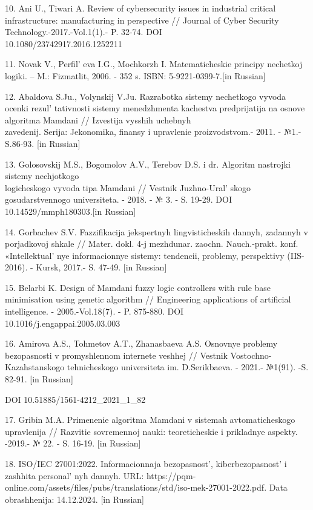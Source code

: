 \begin{references}
10. Ani U., Tiwari A. Review of cybersecurity issues in industrial
critical infrastructure: manufacturing in perspective // Journal of
Cyber Security Technology.-2017.-Vol.1(1).- P. 32-74. DOI\\
10.1080/23742917.2016.1252211

11. Novak V., Perfil' eva I.G., Mochkorzh I.
Matematicheskie principy nechetkoj logiki. -- M.: Fizmatlit, 2006. - 352
s. ISBN: 5-9221-0399-7.{[}in Russian{]}

12. Abaldova S.Ju., Volynskij V.Ju. Razrabotka sistemy nechetkogo vyvoda
ocenki rezul' tativnosti sistemy menedzhmenta kachestva
predprijatija na osnove algoritma Mamdani // Izvestija vysshih uchebnyh\\
zavedenij. Serija: Jekonomika, finansy i upravlenie proizvodstvom.-
2011. - №1.- S.86-93. {[}in Russian{]}

13. Golosovskij M.S., Bogomolov A.V., Terebov D.S. i dr. Algoritm
nastrojki sistemy nechjotkogo \\logicheskogo vyvoda tipa Mamdani //
Vestnik Juzhno-Ural' skogo gosudarstvennogo universiteta.
- 2018. - № 3. - S. 19-29. DOI 10.14529/mmph180303.{[}in Russian{]}

14. Gorbachev S.V. Fazzifikacija jekspertnyh lingvisticheskih dannyh,
zadannyh v porjadkovoj shkale // Mater. dokl. 4-j mezhdunar. zaochn.
Nauch.-prakt. konf. «Intellektual' nye informacionnye
sistemy: tendencii, problemy, perspektivy (IIS-2016). - Kursk, 2017.- S.
47-49. {[}in Russian{]}

15. Belarbi K. Design of Mamdani fuzzy logic controllers with rule base
minimisation using genetic algorithm // Engineering applications of
artificial intelligence. - 2005.-Vol.18(7). - P. 875-880. DOI\\
10.1016/j.engappai.2005.03.003

16. Amirova A.S., Tohmetov A.T., Zhanasbaeva A.S. Osnovnye problemy
bezopasnosti v promyshlennom internete veshhej // Vestnik
Vostochno-Kazahstanskogo tehnicheskogo universiteta im. D.Serikbaeva. -
2021.- №1(91). -S. 82-91. {[}in Russian{]}

DOI 10.51885/1561-4212\_2021\_1\_82

17. Gribin M.A. Primenenie algoritma Mamdani v sistemah avtomaticheskogo
upravlenija // Razvitie sovremennoj nauki: teoreticheskie i prikladnye
aspekty. -2019.- № 22. - S. 16-19. {[}in Russian{]}

18. ISO/IEC 27001:2022. Informacionnaja bezopasnost',
kiberbezopasnost'{} i zashhita
personal' nyh dannyh. URL:
https://pqm-online.com/assets/files/pubs/translations/std/iso-mek-27001-2022.pdf.
Data \\obrashhenija: 14.12.2024. {[}in Russian{]}


\end{references}
